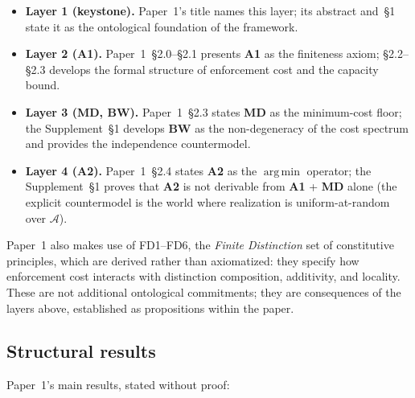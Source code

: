 \documentclass[11pt]{article}
\newcommand{\Aone}{\textbf{A1}}
\newcommand{\argmin}{\mathop{\mathrm{arg\,min}}}
\begin{document}
\begin{itemize}
    \item \textbf{Layer 1 (keystone).} Paper~1's title names this layer; its abstract and~\S1 state it as the ontological foundation of the framework.
    \item \textbf{Layer 2 (\Aone{}).} Paper~1~\S2.0--\S2.1 presents \Aone{} as the finiteness axiom; \S2.2--\S2.3 develops the formal structure of enforcement cost and the capacity bound.
    \item \textbf{Layer 3 (\textbf{MD}, \textbf{BW}).} Paper~1~\S2.3 states \textbf{MD} as the minimum-cost floor; the Supplement~\S1 develops \textbf{BW} as the non-degeneracy of the cost spectrum and provides the independence countermodel.
    \item \textbf{Layer 4 (\textbf{A2}).} Paper~1~\S2.4 states \textbf{A2} as the $\argmin$ operator; the Supplement~\S1 proves that \textbf{A2} is not derivable from \Aone{} + \textbf{MD} alone (the explicit countermodel is the world where realization is uniform-at-random over $\mathcal{A}$).
\end{itemize}

\noindent Paper~1 also makes use of FD1--FD6, the \emph{Finite Distinction} set of constitutive principles, which are derived rather than axiomatized: they specify how enforcement cost interacts with distinction composition, additivity, and locality. These are not additional ontological commitments; they are consequences of the layers above, established as propositions within the paper.

\subsection{Structural results}\label{sec:P1_results}

Paper~1's main results, stated without proof:
\end{document}
